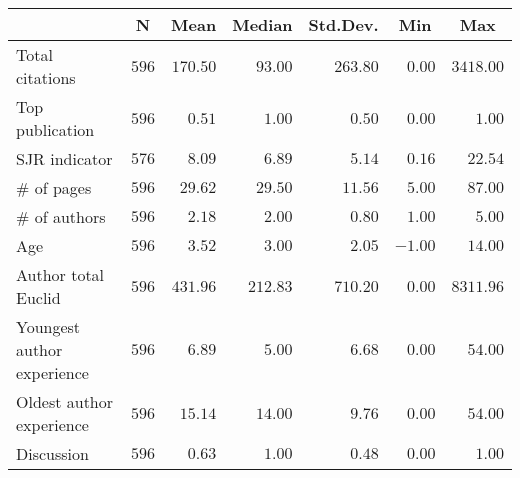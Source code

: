 \begin{center}
\begin{tabular}{lrrrrrr}
\toprule
\multicolumn{1}{l}{}&\multicolumn{1}{c}{N}&\multicolumn{1}{c}{Mean}&\multicolumn{1}{c}{Median}&\multicolumn{1}{c}{Std.Dev.}&\multicolumn{1}{c}{Min}&\multicolumn{1}{c}{Max}\tabularnewline
\midrule
Total citations&$596$&$170.50$&$ 93.00$&$263.80$&$ 0.00$&$3418.00$\tabularnewline
Top publication&$596$&$  0.51$&$  1.00$&$  0.50$&$ 0.00$&$   1.00$\tabularnewline
SJR indicator&$576$&$  8.09$&$  6.89$&$  5.14$&$ 0.16$&$  22.54$\tabularnewline
\# of pages&$596$&$ 29.62$&$ 29.50$&$ 11.56$&$ 5.00$&$  87.00$\tabularnewline
\# of authors&$596$&$  2.18$&$  2.00$&$  0.80$&$ 1.00$&$   5.00$\tabularnewline
Age&$596$&$  3.52$&$  3.00$&$  2.05$&$-1.00$&$  14.00$\tabularnewline
Author total Euclid&$596$&$431.96$&$212.83$&$710.20$&$ 0.00$&$8311.96$\tabularnewline
Youngest author experience&$596$&$  6.89$&$  5.00$&$  6.68$&$ 0.00$&$  54.00$\tabularnewline
Oldest author experience&$596$&$ 15.14$&$ 14.00$&$  9.76$&$ 0.00$&$  54.00$\tabularnewline
Discussion&$596$&$  0.63$&$  1.00$&$  0.48$&$ 0.00$&$   1.00$\tabularnewline
\bottomrule
\end{tabular}\end{center}
